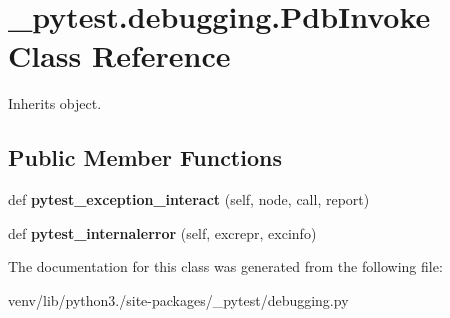 \hypertarget{class__pytest_1_1debugging_1_1_pdb_invoke}{}\section{\+\_\+pytest.\+debugging.\+Pdb\+Invoke Class Reference}
\label{class__pytest_1_1debugging_1_1_pdb_invoke}


Inherits object.

\subsection*{Public Member Functions}
\begin{DoxyCompactItemize}
\item 
\mbox{\label{class__pytest_1_1debugging_1_1_pdb_invoke_a02ea7a3fd33e15da004e4cb557895ab6}} 
def {\bfseries pytest\+\_\+exception\+\_\+interact} (self, node, call, report)
\item 
\mbox{\label{class__pytest_1_1debugging_1_1_pdb_invoke_ae69cd9e1d53d988daf670269c2c7a9e4}} 
def {\bfseries pytest\+\_\+internalerror} (self, excrepr, excinfo)
\end{DoxyCompactItemize}


The documentation for this class was generated from the following file\+:\begin{DoxyCompactItemize}
\item 
venv/lib/python3./site-\/packages/\+\_\+pytest/debugging.\+py\end{DoxyCompactItemize}
